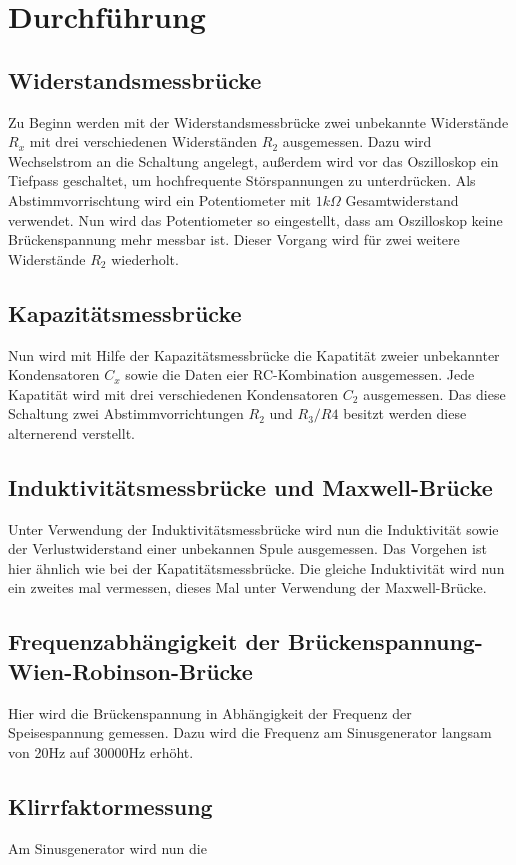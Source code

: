\section{Durchführung}
\subsection{Widerstandsmessbrücke}
Zu Beginn werden mit der Widerstandsmessbrücke zwei unbekannte Widerstände $R_{x}$ mit
drei verschiedenen Widerständen $R_{2}$ ausgemessen.
Dazu wird Wechselstrom an die Schaltung angelegt, außerdem wird vor das Oszilloskop
ein Tiefpass geschaltet, um hochfrequente Störspannungen zu unterdrücken.
Als Abstimmvorrischtung wird ein Potentiometer mit $1k\Omega$ Gesamtwiderstand
verwendet. Nun wird das Potentiometer so eingestellt, dass am Oszilloskop
keine Brückenspannung mehr messbar ist. Dieser Vorgang wird für zwei weitere
Widerstände $R_{2}$ wiederholt.

\subsection{Kapazitätsmessbrücke}
Nun wird mit Hilfe der Kapazitätsmessbrücke die Kapatität zweier unbekannter
Kondensatoren $C_{x}$ sowie die Daten eier RC-Kombination ausgemessen. Jede Kapatität
wird mit drei verschiedenen Kondensatoren $C_{2}$ ausgemessen.
Das diese Schaltung zwei Abstimmvorrichtungen $R_{2}$ und $R_{3}/R{4}$ besitzt werden diese
alternerend verstellt.

\subsection{Induktivitätsmessbrücke und Maxwell-Brücke}
Unter Verwendung der Induktivitätsmessbrücke wird nun die Induktivität sowie
der Verlustwiderstand einer unbekannen Spule ausgemessen. Das Vorgehen ist hier
ähnlich wie bei der Kapatitätsmessbrücke.
Die gleiche Induktivität wird nun ein zweites mal vermessen, dieses Mal unter
Verwendung der Maxwell-Brücke.

\subsection{Frequenzabhängigkeit der Brückenspannung-Wien-Robinson-Brücke}
Hier wird die Brückenspannung in Abhängigkeit der Frequenz der Speisespannung gemessen.
Dazu wird die Frequenz am Sinusgenerator langsam von 20Hz auf 30\:000Hz erhöht.

\subsection{Klirrfaktormessung}
Am Sinusgenerator wird nun die




\label{sec:Durchführung}
